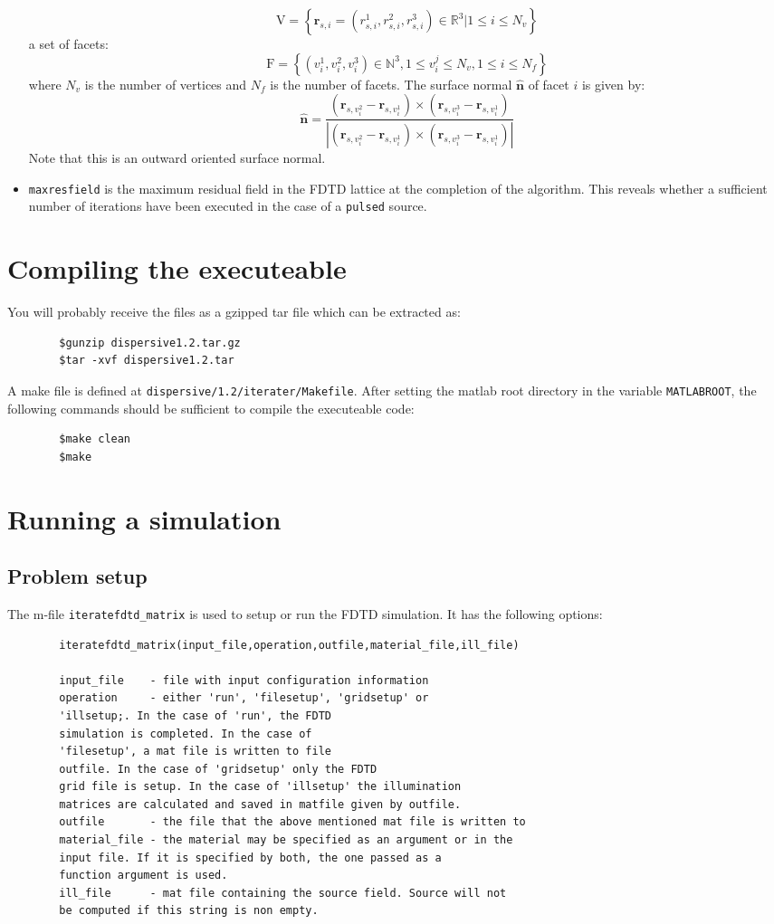 \documentclass[a4paper, 12pt]{article}
\begin{document}
\begin{itemize}
		$$\mathrm{V}=\left\{\mathbf{r}_{s,i}=\left(r_{s,i}^1,r_{s,i}^2,r_{s,i}^3\right)\in
		\mathbb{R}^3|1\le i\le N_v \right\}$$a set of facets:
		$$\mathrm{F}=\left\{\left(v^1_i,v^2_i,v^3_i\right)\in\mathbb{N}^3,1\le
		v_i^j\le N_v,1\le i\le N_f \right\}$$ where $N_v$ is the number of
		vertices and $N_f$ is the number of facets. The surface normal
		$\hat{\boldsymbol{n}}$ of facet $i$ is given by:
		$$\hat{\boldsymbol{n}}=\frac{(\mathbf{r}_{s,v^2_i}-\mathbf{r}_{s,v^1_i})\times(\mathbf{r}_{s,v^3_i}-\mathbf{r}_{s,v^1_i})}{|(\mathbf{r}_{s,v^2_i}-\mathbf{r}_{s,v^1_i})\times(\mathbf{r}_{s,v^3_i}-\mathbf{r}_{s,v^1_i})|}$$Note
		that this is an outward oriented surface normal.
		\item \verb+maxresfield+ is the maximum residual field in the FDTD
		lattice at the completion of the algorithm. This reveals whether
		a sufficient number of iterations have been executed in the case of a
		\verb+pulsed+ source.
	\end{itemize}
	\section{Compiling the executeable}
	You will probably receive the files as a gzipped tar file which can be
	extracted as:
	\begin{verbatim}
		$gunzip dispersive1.2.tar.gz
		$tar -xvf dispersive1.2.tar
	\end{verbatim}
	A make file is defined at
	\verb+dispersive/1.2/iterater/Makefile+. After setting the matlab root
	directory in the variable \verb+MATLABROOT+, the following commands
	should be sufficient to compile the executeable code:
	\begin{verbatim}
		$make clean
		$make
	\end{verbatim}
	
	\section{Running a simulation}
	\subsection{Problem setup}
	The m-file \verb+iteratefdtd_matrix+ is used to setup or run the FDTD
	simulation. It has the following options:
	\begin{verbatim}
		iteratefdtd_matrix(input_file,operation,outfile,material_file,ill_file)
		
		input_file    - file with input configuration information
		operation     - either 'run', 'filesetup', 'gridsetup' or
		'illsetup;. In the case of 'run', the FDTD
		simulation is completed. In the case of
		'filesetup', a mat file is written to file
		outfile. In the case of 'gridsetup' only the FDTD
		grid file is setup. In the case of 'illsetup' the illumination
		matrices are calculated and saved in matfile given by outfile.
		outfile       - the file that the above mentioned mat file is written to
		material_file - the material may be specified as an argument or in the
		input file. If it is specified by both, the one passed as a
		function argument is used.
		ill_file      - mat file containing the source field. Source will not
		be computed if this string is non empty.
	\end{verbatim}
\end{document}
